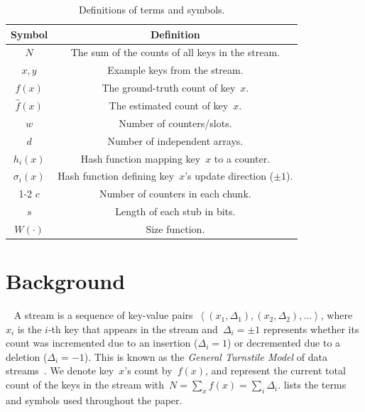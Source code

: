 \documentclass[sigconf]{acmart}
\begin{document}
\begin{table}
    \centering
    \bgroup
    \def\arraystretch{1.025}
    \small
    \begin{tabular}{cc}
        \toprule
        \textbf{Symbol} & \textbf{Definition} \\
        \midrule
        $N$ & The sum of the counts of all keys in the stream. \\
        $x, y$ & Example keys from the stream. \\
        $f(x)$ & The ground-truth count of key~$x$. \\
        $\hat{f}(x)$ & The estimated count of key~$x$. \\
        $w$ & Number of counters/slots. \\
        $d$ & Number of independent arrays. \\
        $h_i(x)$ & Hash function mapping key~$x$ to a counter. \\
        $\sigma_i(x)$ & Hash function defining key~$x$'s update direction ($\pm 1$). \\
        \cmidrule{1-2}
        $c$ & Number of counters in each chunk. \\
        $s$ & Length of each stub in bits. \\
        $W(\cdot)$ & Size function. \\
        \bottomrule
    \end{tabular}
    \egroup
    \caption{Definitions of terms and symbols.}
    \ifnoappendix
      \vspace{-3mm}
    \fi
    \label{tab:term_and_symbol_definitions}
\end{table}

\section{Background}~\label{sec:background}
A stream is a sequence of key-value pairs~$\left\langle (x_1,\Delta_1),
(x_2,\Delta_2), \dots \right\rangle$, where~$x_i$ is the $i$-th key that
appears in the stream and~$\Delta_i = \pm1$ represents whether its count was
incremented due to an insertion ($\Delta_i=1$) or decremented due to a deletion
($\Delta_i=-1$). This is known as the \emph{General Turnstile Model} of data
streams~\cite{StreamModels}. We denote key~$x$'s count by~$f(x)$, and represent
the current total count of the keys in the stream with~$N=\sum_x f(x)=\sum_i
\Delta_i$.  lists the terms and symbols
used throughout the paper.
\end{document}
